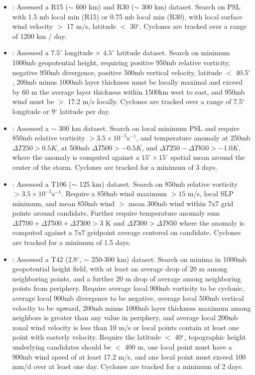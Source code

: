 \documentclass[gmdd, hvmath, online]{copernicus_discussions}
\begin{document}
\begin{itemize}
\item \cite{broccoli1990existing}: Assessed a R15 ($\sim$ 600 km) and R30 ($\sim$ 300 km) dataset.  Search on PSL with 1.5 mb local min (R15) or 0.75 mb local min (R30), with local surface wind velocity $>$ 17 m/s, latitude $<$ 30$^\circ$.  Cyclones are tracked over a range of 1200 km / day.

\item \cite{wu1992gcm}: Assessed a $7.5^\circ$ longitude $\times$ $4.5^\circ$ latitude dataset.  Search on minimum 1000mb geopotential height, requiring positive 950mb relative vorticity, negative 950mb divergence, positive 500mb vertical velocity, latitude $<$ 40.5$^\circ$, 200mb minus 1000mb layer thickness must be locally maximal and exceed by 60 m the average layer thickness within 1500km west to east, and 950mb wind must be $>$ 17.2 m/s locally.  Cyclones are tracked over a range of 7.5$^\circ$ longitude or 9$^\circ$ latitude per day.

\item \cite{haarsma1993tropical}: Assessed a $\sim$ 300 km dataset.  Search on local minimum PSL and require 850mb relative vorticity $> 3.5 \times 10^{-5} \mbox{s}^{-1}$, and temperature anomaly at 250mb $\Delta T250 > 0.5 K$, at 500mb $\Delta T500 > -0.5 K$, and $\Delta T250 - \Delta T850 > -1.0 K$, where the anomaly is computed against a $15^\circ \times 15^\circ$ spatial mean around the center of the storm.  Cyclones are tracked for a minimum of 3 days.

\item \cite{bengtsson1995hurricane, bengtsson1996will}:  Assessed a T106 ($\sim$ 125 km) dataset.  Search on 850mb relative vorticity $> 3.5 \times 10^{-5} \mbox{s}^{-1}$.  Require a 850mb wind maximum $> 15$ m/s, local SLP minimum, and mean 850mb wind $>$ mean 300mb wind within 7x7 grid points around candidate.  Further require temperature anomaly sum $\Delta T700+ \Delta T500+ \Delta T300 > 3$ K and $\Delta T300 > \Delta T850$ where the anomaly is computed against a 7x7 gridpoint average centered on candidate.  Cyclones are tracked for a minimum of 1.5 days.

\item \cite{tsutsui1996simulated}:  Assessed a T42 (2.8$^\circ$, $\sim$ 250-300 km) dataset.  Search on minima in 1000mb geopotential height field, with at least an average drop of 20 m among neighboring points, and a further 20 m drop of average among neighboring points from periphery.  Require average local 900mb vorticity to be cyclonic, average local 900mb divergence to be negative, average local 500mb vertical velocity to be upward, 200mb minus 1000mb layer thickness maximum among neighbors is greater than any value in periphery, and average local 200mb zonal wind velocity is less than 10 m/s or local points contain at least one point with easterly velocity.  Require the latitude $<$ 40$^\circ$, topographic height underlying candidates should be $<$ 400 m, one local point must have a 900mb wind speed of at least 17.2 m/s, and one local point must exceed 100 mm/d over at least one day.  Cyclones are tracked for a minimum of 2 days.


\end{itemize}
\end{document}
